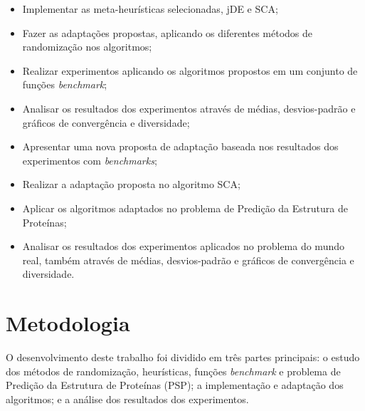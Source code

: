 \begin{itemize}
    \item Implementar as meta-heurísticas selecionadas, jDE e SCA;
    \item Fazer as adaptações propostas, aplicando os diferentes métodos de randomização nos algoritmos;
    \item Realizar experimentos aplicando os algoritmos propostos em um conjunto de funções \textit{benchmark};
    \item Analisar os resultados dos experimentos através de médias, desvios-padrão e gráficos de convergência e diversidade;
    \item Apresentar uma nova proposta de adaptação baseada nos resultados dos experimentos com \textit{benchmarks};
    \item Realizar a adaptação proposta no algoritmo SCA;
    \item Aplicar os algoritmos adaptados no problema de Predição da Estrutura de Proteínas;
    \item Analisar os resultados dos experimentos aplicados no problema do mundo real, também através de médias, desvios-padrão e gráficos de convergência e diversidade.
\end{itemize}

\section{Metodologia}

O desenvolvimento deste trabalho foi dividido em três partes principais: o estudo dos métodos de randomização, heurísticas, funções \textit{benchmark} e problema de Predição da Estrutura de Proteínas (PSP); a implementação e adaptação dos algoritmos; e a análise dos resultados dos experimentos.

